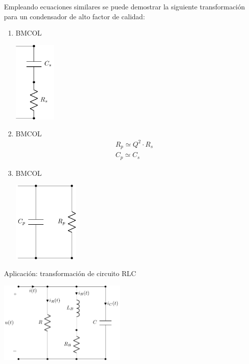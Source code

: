 Empleando ecuaciones similares se puede demostrar la siguiente transformación para un condensador de alto factor de calidad:
\begin{enumerate}
\item \hfill{}\textsc{BMCOL}
\label{sec:org1ccb5ad}
\begin{center}
\includegraphics[height=4cm]{../figs/CondensadorSerie.pdf}
\end{center}
\item \hfill{}\textsc{BMCOL}
\label{sec:org4c6472c}
\[
\boxed{
\begin{array}{l}
  R_p \simeq Q^2 \cdot R_s\\
  C_p \simeq C_s
\end{array}}
\]

\item \hfill{}\textsc{BMCOL}
\label{sec:org7c245a2}
\begin{center}
\includegraphics[height=4cm]{../figs/CondensadorParalelo.pdf}
\end{center}
\end{enumerate}

{Aplicación: transformación de circuito RLC}

\begin{center}
\includegraphics[height=4cm]{../figs/resonante_real.pdf}
\end{center}

